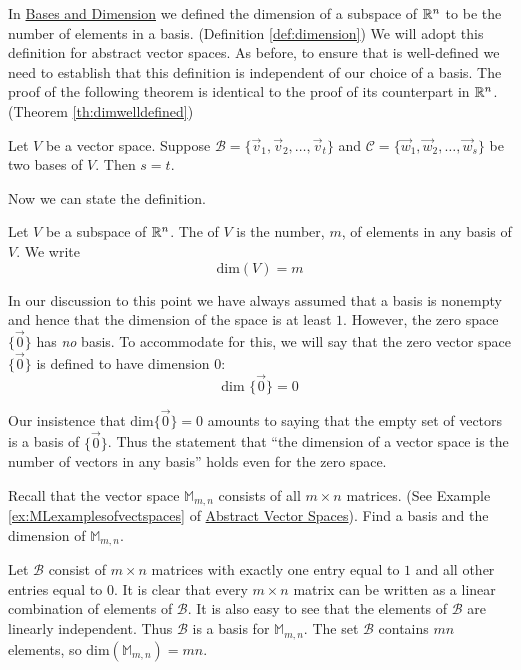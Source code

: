\documentclass{ximera}
\begin{document}
In \href{https://ximera.osu.edu/oerlinalg/LinearAlgebra/VSP-0035/main}{Bases and Dimension} we defined the dimension of a subspace of $\mathbb{R}^n$ to be the number of elements in a basis. (Definition \ref{def:dimension})  We will adopt this definition for abstract vector spaces.  As before, to ensure that  is well-defined we need to establish that this definition is independent of our choice of a basis.  The proof of the following theorem is identical to the proof of its counterpart in $\mathbb{R}^n$.  (Theorem \ref{th:dimwelldefined})

\begin{theorem}\label{th:dimwelldefinedabstract}
Let $V$ be a vector space.  Suppose $\mathcal{B}=\{\vec{v}_1, \vec{v}_2,\ldots ,\vec{v}_t\}$ and $\mathcal{C}=\{\vec{w}_1, \vec{w}_2,\ldots ,\vec{w}_s\}$ be two bases of $V$.  Then $s=t$.
\end{theorem}
Now we can state the definition.
\begin{definition}\label{def:dimensionabstract}
Let $V$ be a subspace of $\mathbb{R}^n$.  The  of $V$ is the number, $m$, of elements in any basis of $V$.  We write
$$\mbox{dim}(V)=m$$
\end{definition}

In our discussion to this point we have always assumed that a basis is nonempty and hence that the dimension of the space is at least $1$. However, the zero space $\{\vec{0}\}$ has {\it no} basis.  To accommodate for this, we will say that the zero vector space $\{\vec{0}\}$ is defined to have dimension $0$:
\begin{equation*}
\mbox{dim }\{\vec{0}\} = 0
\end{equation*}

Our insistence that $\mbox{dim}\{\vec{0}\} = 0$ amounts to saying that the empty set of vectors is a basis of $\{\vec{0}\}$. Thus the statement that ``the dimension of a vector space is the number of vectors in any basis'' holds even for the zero space. 

\begin{example}\label{ex:dimofM}
Recall that the vector space $\mathbb{M}_{m,n}$ consists of all $m\times n$ matrices. (See Example \ref{ex:MLexamplesofvectspaces} of \href{https://ximera.osu.edu/oerlinalg/LinearAlgebra/VSP-0050/main}{Abstract Vector Spaces}).  Find a basis and the dimension of $\mathbb{M}_{m,n}$.
\begin{explanation}
Let $\mathcal{B}$ consist of $m\times n$ matrices 
 with exactly one entry equal to $1$ and all other entries equal to $0$. It is clear that every $m\times n$ matrix can be written as a linear combination of elements of $\mathcal{B}$.  It is also easy to see that the elements of $\mathcal{B}$ are linearly independent.  Thus $\mathcal{B}$ is a basis for $\mathbb{M}_{m,n}$.  The set $\mathcal{B}$ contains $mn$ elements, so $\mbox{dim}(\mathbb{M}_{m,n})=mn$.
\end{explanation}
\end{example}
\end{document}
